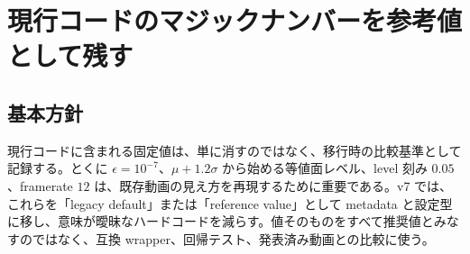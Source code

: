\documentclass[uplatex,dvipdfmx,ja=standard,11pt,a4paper]{bxjsarticle}
\begin{document}
\section{現行コードのマジックナンバーを参考値として残す}
\subsection{基本方針}
現行コードに含まれる固定値は、単に消すのではなく、移行時の比較基準として記録する。とくに \(\epsilon=10^{-7}\)、\(\mu+1.2\sigma\) から始める等値面レベル、level 刻み \(0.05\)、framerate \(12\) は、既存動画の見え方を再現するために重要である\cite{VisualizingVisualization}。v7 では、これらを「legacy default」または「reference value」として metadata と設定型に移し、意味が曖昧なハードコードを減らす。値そのものをすべて推奨値とみなすのではなく、互換 wrapper、回帰テスト、発表済み動画との比較に使う。
\end{document}
